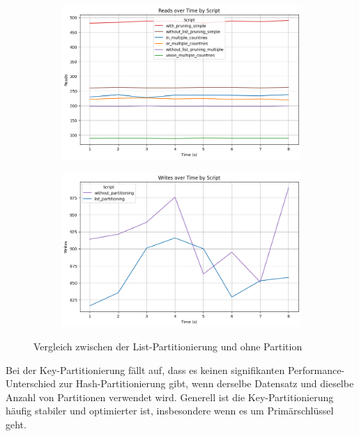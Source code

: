 \vspace{-8pt}
\begin{figure}[H]
	\centering
	\begin{subfigure}[t]{0.48\textwidth}
		\includegraphics[width=\textwidth]{PNGs/Script/Partition/list-partition/Reads}
	\end{subfigure}
	\hfill
	\begin{subfigure}[t]{0.48\textwidth}
		\includegraphics[width=\textwidth]{PNGs/Script/Partition/list-partition/Writes}
	\end{subfigure}
	\vspace{-20pt}
	\caption[List-Partitionierung: Unterschiedliche Abfragen mit und ohne Partition]{Vergleich zwischen der List-Partitionierung und ohne Partition}
	\label{fig:list-partition}
\end{figure}
\vspace{-12pt}

Bei der Key-Partitionierung fällt auf, dass es keinen signifikanten Performance-Unterschied zur Hash-Partitionierung gibt, wenn derselbe Datensatz und dieselbe Anzahl von Partitionen verwendet wird.
Generell ist die Key-Partitionierung häufig stabiler und optimierter ist, insbesondere wenn es um Primärschlüssel geht.

